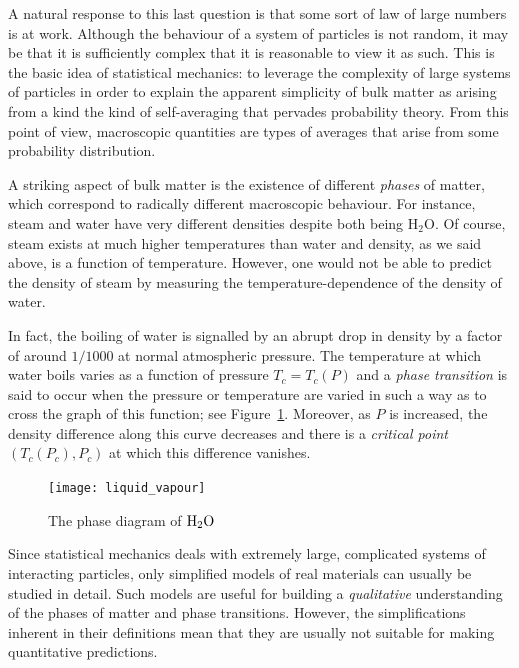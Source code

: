A natural response to this last question is that some sort of law of large numbers
is at work. Although the behaviour of a system of particles is not random, it may
be that it is sufficiently complex that it is reasonable to view it as such.
This is the basic idea of statistical mechanics: to leverage the complexity of
large systems of particles in order to explain the apparent simplicity of bulk
matter as arising from a kind the kind of self-averaging that pervades probability
theory. From this point of view, macroscopic quantities are types of averages that
arise from some probability distribution.

A striking aspect of bulk matter is the
existence of different \emph{phases} of matter, which correspond to radically different
macroscopic behaviour. For instance, steam and water have very different densities despite
both being $\mathrm{H_2O}$. Of course, steam exists at much higher temperatures than water
and density, as we said above, is a function of temperature. However, one would not be
able to predict the density of steam by measuring the temperature-dependence of the
density of water.

In fact, the boiling of water is signalled by an abrupt drop in density by a factor
of around $1/1000$ at normal atmospheric pressure. The temperature at which water
boils varies as a function of pressure $T_c = T_c(P)$ and a \emph{phase transition}
is said to occur when the pressure or temperature are varied in such a way as to
cross the graph of this function; see Figure~\ref{fig:liquid-vapour}.
Moreover, as $P$ is increased, the density difference along this curve decreases and
there is a \emph{critical point} $(T_c(P_c), P_c)$ at which this difference vanishes.

\begin{figure}
\centering
\label{fig:liquid-vapour}
\texttt{[image: liquid\_vapour]}
\caption{The phase diagram of $\rm H_2 O$}
\end{figure}

Since statistical mechanics deals with extremely large, complicated systems of
interacting particles, only simplified models of real materials can usually be
studied in detail. Such models are useful for building a
\emph{qualitative} understanding of the phases of matter and phase transitions.
However, the simplifications inherent in their definitions mean that they are
usually not suitable for making quantitative predictions.

